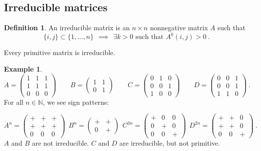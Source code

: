 \documentclass{amsart}
\theoremstyle{definition}
\newtheorem{de}[equation]{Definition}
\newtheorem{ex}[equation]{Example}
\theoremstyle{definition}
\newcommand{\N}{\mathbb N}
\numberwithin{equation}{subsection}
\begin{document}
\subsection{Irreducible matrices}

\begin{de} An irreducible matrix is an $n\times n$
nonnegative matrix $A$ such that
\[
\{ i,j\} \subset \{1, \dots,   n\}
\ \ \implies \  \
\exists k>0 \text{ such that }
A^k(i,j) >0 \  .
\]
\end{de}
Every primitive matrix is irreducible.
\begin{ex}
\[
A = \begin{pmatrix} 1&1&1 \\ 1& 1& 1 \\ 0&0&0\end{pmatrix}  \quad \quad
B= \begin{pmatrix} 1&1 \\ 0& 1 \end{pmatrix}  \quad \quad
C=\begin{pmatrix} 0&1&0 \\ 0& 0& 1 \\ 1&0&0\end{pmatrix}  \quad \quad
D=\begin{pmatrix} 0&0&1 \\ 0& 0& 1 \\ 1&1&0\end{pmatrix} \ .
\]
For all $n\in \N$, we see sign patterns:

\[
A^n = \begin{pmatrix} +&+&+ \\ +& +& + \\ 0&0&0\end{pmatrix}  \ \
B^n= \begin{pmatrix} +&+ \\ 0& + \end{pmatrix}  \ \
C^{3n}=\begin{pmatrix} +&0&0 \\ 0& +& 0 \\ 0&0&+\end{pmatrix}  \ \
D^{2n}=\begin{pmatrix} +&+&0 \\ +& +& 0 \\ 0&0&+\end{pmatrix} \ .
\]
$A$ and $B$ are not irreducible.
$C$ and $D$ are irreducible, but not primitive.
\end{ex}

\end{document}
